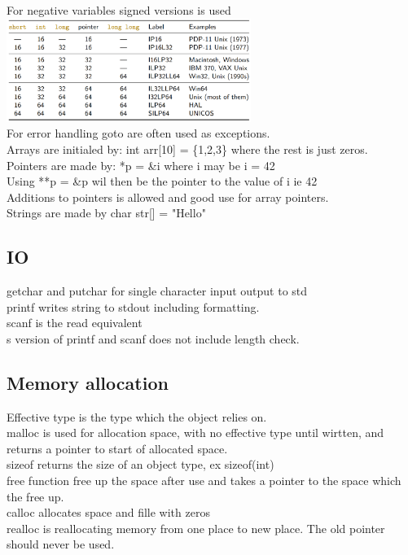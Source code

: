 \documentclass[12pt, a4paper]{article}
\begin{document}
		For negative variables signed versions is used\\
		\includegraphics[width=300px]{assets/cDataSize.png}\\
		For error handling goto are often used as exceptions.\\
		Arrays are initialed by: int arr[10] = \{1,2,3\} where the rest is just zeros.\\
		Pointers are made by: *p = \&i where i may be i = 42\\
		Using **p = \&p wil then be the pointer to the value of i ie 42\\
		Additions to pointers is allowed and good use for array pointers.\\
		Strings are made by char str[] = "Hello"
		\subsection{IO}
			getchar and putchar for single character input output to std\\
			printf writes string to stdout including formatting.\\
			scanf is the read equivalent\\
			s version of printf and scanf does not include length check.\\
		\subsection{Memory allocation}
			Effective type is the type which the object relies on.\\
			malloc is used for allocation space, with no effective type until wirtten, and returns a pointer to start of allocated space.\\
			sizeof returns the size of an object type, ex sizeof(int)\\
			free function free up the space after use and takes a pointer to the space which the free up.\\
			calloc allocates space and fille with zeros\\
			realloc is reallocating memory from one place to new place. The old pointer should never be used.\\
				
			
\end{document}
